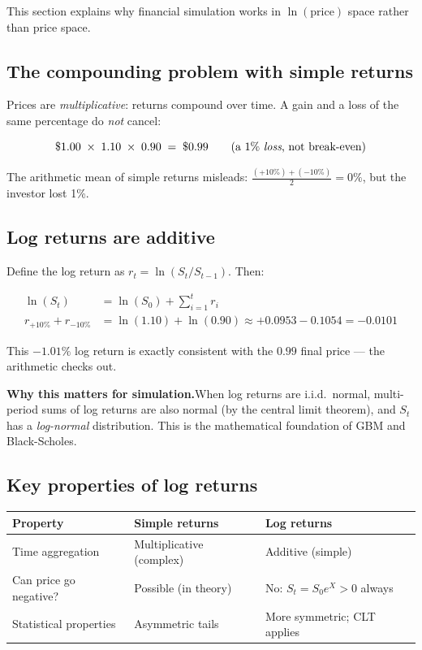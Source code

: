 \documentclass[11pt, a4paper]{article}
\begin{document}
This section explains why financial simulation works in $\ln(\text{price})$ space rather than price space.

\subsection*{The compounding problem with simple returns}

Prices are \textit{multiplicative}: returns compound over time. A gain and a loss of the same percentage do \emph{not} cancel:

\begin{tcolorbox}[mathbox]
\[
  \$1.00 \;\times\; 1.10 \;\times\; 0.90 \;=\; \$0.99 \qquad \text{(a 1\% \emph{loss}, not break-even)}
\]
\end{tcolorbox}

The arithmetic mean of simple returns misleads: $\frac{(+10\%) + (-10\%)}{2} = 0\%$, but the investor lost 1\%.

\subsection*{Log returns are additive}

Define the log return as $r_t = \ln(S_t / S_{t-1})$. Then:

\begin{align*}
  \ln(S_t) &= \ln(S_0) + \sum_{i=1}^{t} r_i \\
  r_{+10\%} + r_{-10\%} &= \ln(1.10) + \ln(0.90) \approx +0.0953 - 0.1054 = -0.0101
\end{align*}

This $-1.01\%$ log return is exactly consistent with the $0.99$ final price — the arithmetic checks out.

\begin{tcolorbox}[infobox]
\textbf{Why this matters for simulation.}\quad When log returns are i.i.d.\ normal, multi-period sums of log returns are also normal (by the central limit theorem), and $S_t$ has a \emph{log-normal} distribution. This is the mathematical foundation of GBM and Black-Scholes.
\end{tcolorbox}

\subsection*{Key properties of log returns}

\begin{center}
\begin{tabular}{lll}
  \toprule
  Property & Simple returns & Log returns \\
  \midrule
  Time aggregation & Multiplicative (complex) & Additive (simple) \\
  Can price go negative? & Possible (in theory) & No: $S_t = S_0 e^X > 0$ always \\
  Statistical properties & Asymmetric tails & More symmetric; CLT applies \\
  \bottomrule
\end{tabular}
\end{center}
\end{document}
